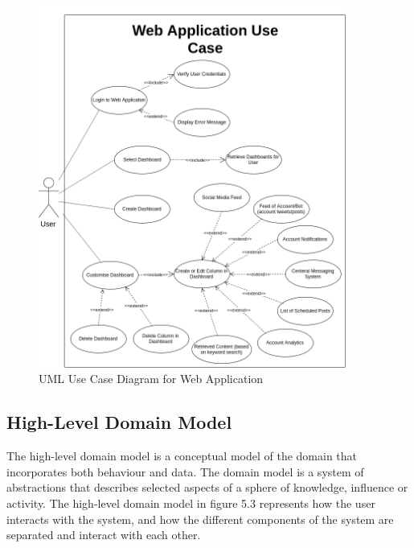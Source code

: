 \begin{figure}[H]
  \centering
  \includegraphics[width=0.9\textwidth]{images/usecasewebapp-2.png}
  \caption{UML Use Case Diagram for Web Application}
\end{figure}

\subsection{High-Level Domain Model}

The high-level domain model is a conceptual model of the domain that incorporates both behaviour and data. The domain model is a system of abstractions that describes selected aspects of a sphere of knowledge, influence or activity. The high-level domain model in figure 5.3 represents how the user interacts with the system, and how the different components of the system are separated and interact with each other.

